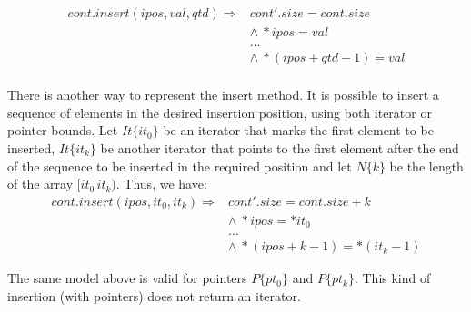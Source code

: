 \documentclass[a4paper]{llncs}
\begin{document}
\[\begin{array}{ll}
cont.insert(ipos, val, qtd) \Longrightarrow & cont'.size = cont.size \\
  & \wedge \: *ipos = val \\
  & \ldots \\
  & \wedge \: *(ipos + qtd - 1) = val \\
\end{array}\]

There is another way to represent the insert method.
It is possible to insert a sequence of elements in the desired
insertion position, using both iterator or pointer bounds.
Let $It\{it_0\}$ be an iterator that marks the first element
to be inserted, $It\{it_k\}$ be another iterator that
points to the first element after the end of the sequence to be inserted
in the required position and let $N\{k\}$ be the length of the array $[it_0\, it_k)$.
Thus, we have:
%
\[\begin{array}{ll}
cont.insert(ipos, it_0, it_k) \Longrightarrow & cont'.size = cont.size + k\\
  & \wedge \: *ipos = *it_0 \\
  & \ldots \\
  & \wedge \: *(ipos + k - 1) = *(it_k - 1)
\end{array}\]

The same model above is valid for pointers $P\{pt_0\}$ and $P\{pt_k\}$.
This kind of insertion (with pointers) does not return an iterator.
\end{document}
